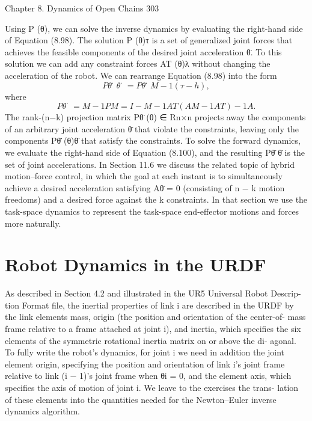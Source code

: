 \documentclass[12pt,a4paper]{article}
\begin{document}
Chapter 8. Dynamics of Open Chains                                                                  303

    Using P (θ), we can solve the inverse dynamics by evaluating the right-hand
side of Equation (8.98). The solution P (θ)τ is a set of generalized joint forces
that achieves the feasible components of the desired joint acceleration θ̈. To
this solution we can add any constraint forces AT (θ)λ without changing the
acceleration of the robot.
    We can rearrange Equation (8.98) into the form
\begin{equation}
Pθ̈ θ̈ = Pθ̈ M −1 (τ − h),
\label{eq:8.100}
\end{equation}
where
\begin{equation}
Pθ̈ = M −1 P M = I − M −1 AT (AM −1 AT )−1 A.
\label{eq:8.101}
\end{equation}
The rank-(n−k) projection matrix Pθ̈ (θ) ∈ Rn×n projects away the components
of an arbitrary joint acceleration θ̈ that violate the constraints, leaving only the
components Pθ̈ (θ)θ̈ that satisfy the constraints. To solve the forward dynamics,
we evaluate the right-hand side of Equation (8.100), and the resulting Pθ̈ θ̈ is
the set of joint accelerations.
    In Section 11.6 we discuss the related topic of hybrid motion–force control, in
which the goal at each instant is to simultaneously achieve a desired acceleration
satisfying Aθ̈ = 0 (consisting of n − k motion freedoms) and a desired force
against the k constraints. In that section we use the task-space dynamics to
represent the task-space end-effector motions and forces more naturally.

\section{Robot Dynamics in the URDF}
As described in Section 4.2 and illustrated in the UR5 Universal Robot Descrip-
tion Format file, the inertial properties of link i are described in the URDF by
the link elements mass, origin (the position and orientation of the center-of-
mass frame relative to a frame attached at joint i), and inertia, which specifies
the six elements of the symmetric rotational inertia matrix on or above the di-
agonal. To fully write the robot’s dynamics, for joint i we need in addition the
joint element origin, specifying the position and orientation of link i’s joint
frame relative to link (i − 1)’s joint frame when θi = 0, and the element axis,
which specifies the axis of motion of joint i. We leave to the exercises the trans-
lation of these elements into the quantities needed for the Newton–Euler inverse
dynamics algorithm.
\end{document}
